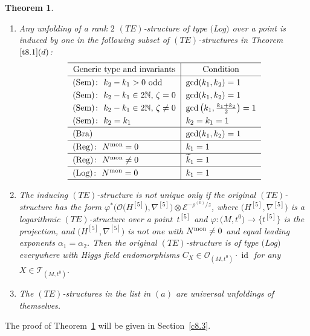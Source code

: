\documentclass[pdftex]{sigma}%
\numberwithin{equation}{section}
\numberwithin{figure}{section}
\newcommand{\N}{{\mathbb N}}
\newcommand{\EE}{{\mathcal E}}
\newcommand{\OO}{{\mathcal O}}
\newcommand{\TT}{{\mathcal T}}
\newcommand{\www}{\widetilde}
\newcommand{\nnn}{\nabla}
\DeclareMathOperator{\id}{id}
\newtheorem{Theorem}{Theorem}[section]
\begin{document}
\begin{Theorem}\label{t8.5}\quad
\begin{enumerate}\itemsep=0pt
\item[$(a)$] Any unfolding of a rank $2$ $(TE)$-structure of type $($Log$)$
over a point is induced by one in the
following subset of $(TE)$-structures in Theorem~$\ref{t8.1}(d)$:
\begin{gather}\label{8.12}
\def\arraystretch{1.25}
\begin{tabular}{l|l}
\hline
\multicolumn{1}{c|}{Generic type and invariants} & \multicolumn{1}{c}{Condition}
\\ \hline
$($Sem$)\colon\ k_2-k_1>0$ odd & $\gcd(k_1,k_2)=1$
\\
$($Sem$)\colon\ k_2-k_1\in 2\N$, $\zeta= 0$ & $\gcd(k_1,k_2)=1$
\\
$($Sem$)\colon\ k_2-k_1\in 2\N$, $\zeta\neq 0$ &$\gcd\big(k_1,\frac{k_1+k_2}{2}\big)=1$
\\
$($Sem$)\colon\ k_2=k_1$ & $k_2=k_1=1 $
\\ \hline
$($Bra$)$ & $\gcd(k_1,k_2)=1$
\\ \hline
$($Reg$)\colon\ N^{\rm mon}=0$ & $k_1=1$
\\ \hline
$($Reg$)\colon\ N^{\rm mon}\neq 0$ & $\www k_1=1$
\\ \hline
$($Log$)\colon\ N^{\rm mon}=0$ &$ k_1=1$
\\
\hline
\end{tabular}
\end{gather}

\item[$(b)$] The inducing $(TE)$-structure is not unique only if
the original $(TE)$-structure has the form
$\varphi^*\big(\OO\big(H^{[5]}\big),\nnn^{[5]}\big)\otimes \EE^{-\rho^{(0)}/z}$,
where $\big(H^{[5]},\nnn^{[5]}\big)$ is a logarithmic
$(TE)$-structure over a point~$t^{[5]}$ and
$\varphi\colon \big(M,t^0\big)\to\big\{t^{[5]}\big\}$ is the projection,
and $\big(H^{[5]},\nnn^{[5]}\big)$ is not one with $N^{\rm mon}\neq 0$
and equal leading exponents $\alpha_1=\alpha_2$.
Then the original $(TE)$-structure is of type $($Log$)$
everywhere with Higgs field endomorphisms
$C_X\in\OO_{(M,t^0)}\cdot\id$ for any $X\in \TT_{(M,t^0)}$.

\item[$(c)$] The $(TE)$-structures in the list in $(a)$ are universal
unfoldings of themselves.
\end{enumerate}
\end{Theorem}


The proof of Theorem~\ref{t8.5} will be given in
Section~\ref{c8.3}.
\end{document}
